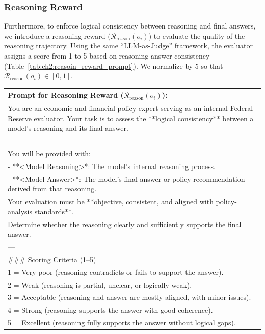 \subsubsection*{Reasoning Reward}


Furthermore, to enforce logical consistency between reasoning and final answers, we introduce a reasoning reward ($\mathcal{R}_{\text{reason}}(o_i)$) to evaluate the quality of the reasoning trajectory. Using the same ``LLM-as-Judge'' framework, the evaluator assigns a score from 1 to 5 based on reasoning-answer consistency (Table~\ref{tab:ch2:reasoin_reward_prompt}). We normalize by 5 so that $\mathcal{R}_{\text{reason}}(o_i)\in[0,1]$.


\begin{table}[htbp]
    \centering
    \footnotesize
    \begin{tabular}{p{}}
    \toprule
        \textbf{Prompt for Reasoning Reward ($\mathcal{R}_{\text{reason}}(o_i)$):} \\
    \midrule
    You are an economic and financial policy expert serving as an internal Federal Reserve evaluator. Your task is to assess the **logical consistency** between a model's reasoning and its final answer. \\
    ~\\
    You will be provided with: \\
    - **\textless Model Reasoning\textgreater**: The model’s internal reasoning process.  \\
    - **\textless Model Answer\textgreater**: The model’s final answer or policy recommendation derived from that reasoning. \\

    Your evaluation must be **objective, consistent, and aligned with policy-analysis standards**. \\
    Determine whether the reasoning clearly and sufficiently supports the final answer. \\

    --- \\

    \#\#\# Scoring Criteria (1--5) \\

    1 = Very poor (reasoning contradicts or fails to support the answer). \\
    2 = Weak (reasoning is partial, unclear, or logically weak).  \\
    3 = Acceptable (reasoning and answer are mostly aligned, with minor issues).  \\
    4 = Strong (reasoning supports the answer with good coherence).  \\
    5 = Excellent (reasoning fully supports the answer without logical gaps).\\
    

\end{tabular}
\end{table}
